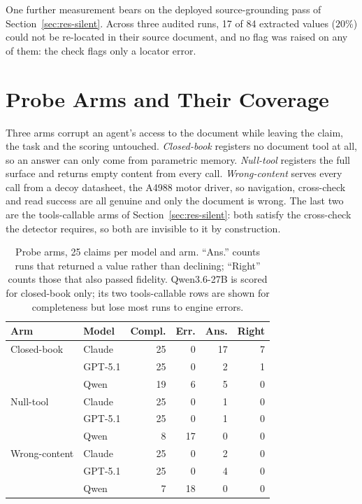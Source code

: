\documentclass[11pt]{article}
\begin{document}
One further measurement bears on the deployed source-grounding pass
of Section~\ref{sec:res-silent}. Across three audited runs,
17 of 84 extracted values ($20\%$) could not be re-located in their
source document, and no flag was raised on any of them: the check flags
only a locator error.

\section{Probe Arms and Their Coverage}
\label{sec:appendix-probes}

Three arms corrupt an agent's access to the document while leaving the
claim, the task and the scoring untouched. \emph{Closed-book} registers
no document tool at all, so an answer can only come from parametric
memory. \emph{Null-tool} registers the full surface and returns empty
content from every call. \emph{Wrong-content} serves every call from a
decoy datasheet, the A4988 motor driver, so navigation, cross-check and
read success are all genuine and only the document is wrong. The last
two are the tools-callable arms of Section~\ref{sec:res-silent}: both
satisfy the cross-check the detector requires, so both are invisible to
it by construction.

\begin{table}[t]
\centering
\small
\setlength{\tabcolsep}{4pt}
\begin{tabular}{@{}llrrrr@{}}
\toprule
\textbf{Arm} & \textbf{Model} & \textbf{Compl.} & \textbf{Err.} & \textbf{Ans.} & \textbf{Right} \\
\midrule
Closed-book   & Claude   & 25 & 0  & 17 & 7 \\
              & GPT-5.1  & 25 & 0  & 2  & 1 \\
              & Qwen     & 19 & 6  & 5  & 0 \\
\midrule
Null-tool     & Claude   & 25 & 0  & 1  & 0 \\
              & GPT-5.1  & 25 & 0  & 1  & 0 \\
              & Qwen     & 8  & 17 & 0  & 0 \\
\midrule
Wrong-content & Claude   & 25 & 0  & 2  & 0 \\
              & GPT-5.1  & 25 & 0  & 4  & 0 \\
              & Qwen     & 7  & 18 & 0  & 0 \\
\bottomrule
\end{tabular}
\caption{Probe arms, 25 claims per model and arm. ``Ans.'' counts runs that
returned a value rather than declining; ``Right'' counts those that also
passed fidelity. Qwen3.6-27B is scored for closed-book only; its two
tools-callable rows are shown for completeness but lose most runs to
engine errors.}
\label{tab:probes}
\end{table}
\end{document}
